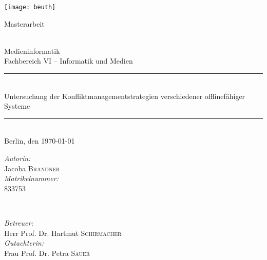 \begin{titlepage}


\center %


\begin{center}
\texttt{[image: beuth]}  \\[2cm]
\end{center}

\begin{Large}
Masterarbeit
\end{Large}\\[0.4cm]
\LARGE{Medieninformatik}\\
\large{Fachbereich VI -- Informatik und Medien}\\[0.5cm]


\rule{\textwidth}{0.4pt}\\[1cm] %
{\LARGE Untersuchung der Konfliktmanagementstrategien verschiedener offlinefähiger Systeme}\\[\baselineskip]

\rule{\textwidth}{0.4pt}\\[1cm]%

{\Large Berlin, den \today{}} %
\vfill


\begin{minipage}{0.49\textwidth}
\begin{flushleft} \large
\emph{Autorin:}\\
Jacoba \textsc{Brandner} \\
\emph{Matrikelnummer:}\\
833753
\end{flushleft}
\end{minipage}
~
\begin{minipage}{0.49\textwidth}
\begin{flushright} \large
\emph{Betreuer:} \\
Herr Prof. Dr. Hartmut \textsc{Schirmacher} \\
\emph{Gutachterin:} \\
Frau Prof. Dr. Petra \textsc{Sauer} \\
\end{flushright}
\end{minipage}


\vfill %
\end{titlepage}
